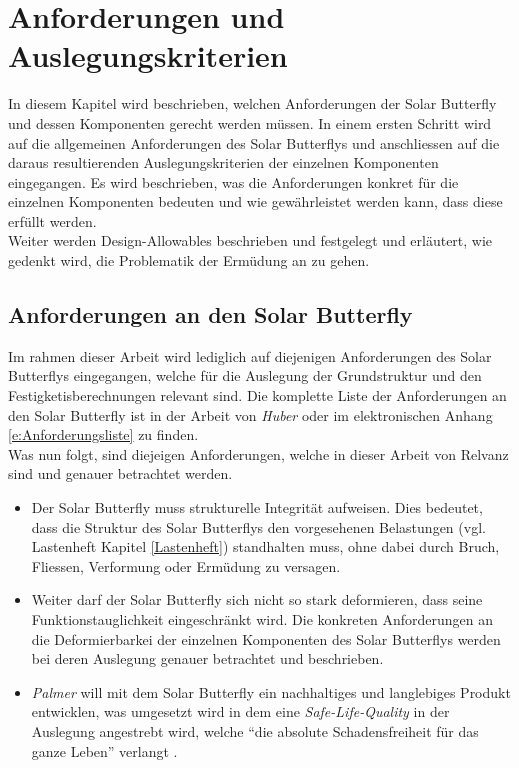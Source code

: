 \section{Anforderungen und Auslegungskriterien}
In diesem Kapitel wird beschrieben, welchen Anforderungen der Solar Butterfly und dessen Komponenten gerecht werden müssen. In einem ersten Schritt wird auf die allgemeinen Anforderungen des Solar Butterflys und anschliessen auf die daraus resultierenden Auslegungskriterien der einzelnen Komponenten eingegangen. Es wird beschrieben, was die Anforderungen konkret für die einzelnen Komponenten bedeuten und wie gewährleistet werden kann, dass diese erfüllt werden.\\
Weiter werden  Design-Allowables beschrieben und festgelegt und erläutert, wie gedenkt wird, die Problematik der Ermüdung	an zu gehen.


\subsection{Anforderungen an den Solar Butterfly}
Im rahmen dieser Arbeit wird lediglich auf diejenigen Anforderungen des Solar Butterflys eingegangen, welche für die Auslegung der Grundstruktur und den Festigketisberechnungen relevant sind. Die komplette Liste der Anforderungen an den Solar Butterfly ist in der Arbeit von \emph{Huber} \cite{Huber} oder im elektronischen Anhang \ref{e:Anforderungsliste} zu finden.\\
Was nun folgt, sind diejeigen Anforderungen, welche in dieser Arbeit von Relvanz sind und genauer betrachtet werden.

\begin{itemize}
  \item Der Solar Butterfly muss strukturelle Integrität aufweisen. Dies bedeutet, dass die Struktur des Solar Butterflys den vorgesehenen Belastungen (vgl. Lastenheft Kapitel \ref{Lastenheft}) standhalten muss, ohne dabei durch Bruch, Fliessen, Verformung oder Ermüdung zu versagen.
  \item Weiter darf der Solar Butterfly sich nicht so stark deformieren, dass seine Funktionstauglichkeit eingeschränkt wird. Die konkreten Anforderungen an die Deformierbarkei der einzelnen Komponenten des Solar Butterflys werden bei deren Auslegung genauer betrachtet und beschrieben.
  \item \emph{Palmer} will mit dem Solar Butterfly ein nachhaltiges und langlebiges Produkt entwicklen, was umgesetzt wird in dem eine \emph{Safe-Life-Quality} in der Auslegung angestrebt wird, welche ``die absolute Schadensfreiheit für das ganze Leben'' verlangt \cite{klein}.
\end{itemize}

